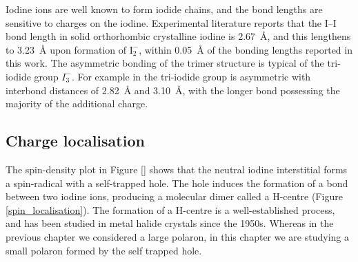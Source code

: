Iodine ions are well known to form iodide chains, and the bond lengths are sensitive to charges on the iodine.
Experimental literature reports that the I--I bond length in solid orthorhombic crystalline iodine is \SI{2.67}{\angstrom}, and this lengthens to \SI{3.23}{\angstrom} upon formation of $\mathrm{I}_2^-$, within \SI{0.05}{\angstrom} of the bonding lengths reported in this work.
The asymmetric bonding of the trimer structure is typical of the tri-iodide group $I_3^-$. For example in  the tri-iodide group is asymmetric with interbond distances of \SI{2.82}{\angstrom} and \SI{3.10}{\angstrom}, with the longer bond possessing the majority of the additional charge. 


\subsection{Charge localisation} \label{ss:chglocal}
The spin-density plot in Figure \ref{} shows that the neutral iodine interstitial forms a spin-radical with a self-trapped hole.
The hole induces the formation of a bond between two iodine ions, producing a molecular dimer called a H-centre (Figure \ref{spin_localisation}). The formation of a H-centre is a well-established process, and has been studied in metal halide crystals since the 1950s.\autocite{} %
Whereas in the previous chapter we considered a large polaron, in this chapter we are studying a small polaron formed by the self trapped hole.

